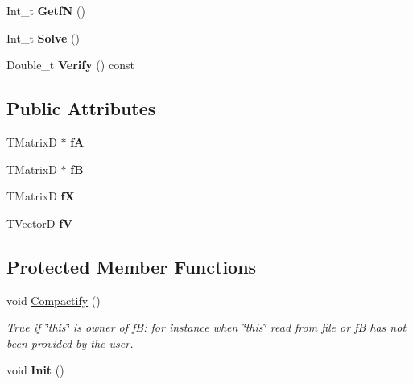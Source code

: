 \begin{DoxyCompactItemize}
\item 
\hypertarget{classTBandedLE_aee31a68599f547c764f4ecdafde6831f}{
Int\_\-t {\bfseries GetfN} ()}
\label{classTBandedLE_aee31a68599f547c764f4ecdafde6831f}

\item 
\hypertarget{classTBandedLE_acdc5e78e84c016c6b37c0f94e16184ca}{
Int\_\-t {\bfseries Solve} ()}
\label{classTBandedLE_acdc5e78e84c016c6b37c0f94e16184ca}

\item 
\hypertarget{classTBandedLE_adbcd39deac9f8711f7154e7552ca1151}{
Double\_\-t {\bfseries Verify} () const }
\label{classTBandedLE_adbcd39deac9f8711f7154e7552ca1151}

\end{DoxyCompactItemize}
\subsection*{Public Attributes}
\begin{DoxyCompactItemize}
\item 
\hypertarget{classTBandedLE_add083d782cac403e47ef44d1b047982f}{
TMatrixD $\ast$ {\bfseries fA}}
\label{classTBandedLE_add083d782cac403e47ef44d1b047982f}

\item 
\hypertarget{classTBandedLE_a6ff8099635a38a29aaab855688b61bb0}{
TMatrixD $\ast$ {\bfseries fB}}
\label{classTBandedLE_a6ff8099635a38a29aaab855688b61bb0}

\item 
\hypertarget{classTBandedLE_a7c68ccf2ccaea19424492c508febd82e}{
TMatrixD {\bfseries fX}}
\label{classTBandedLE_a7c68ccf2ccaea19424492c508febd82e}

\item 
\hypertarget{classTBandedLE_a044d8f4c2ac4dbd11798e6ace569058b}{
TVectorD {\bfseries fV}}
\label{classTBandedLE_a044d8f4c2ac4dbd11798e6ace569058b}

\end{DoxyCompactItemize}
\subsection*{Protected Member Functions}
\begin{DoxyCompactItemize}
\item 
\hypertarget{classTBandedLE_a8e09b2648396e1e8652ff8b0727965c1}{
void \hyperlink{classTBandedLE_a8e09b2648396e1e8652ff8b0727965c1}{Compactify} ()}
\label{classTBandedLE_a8e09b2648396e1e8652ff8b0727965c1}

\begin{DoxyCompactList}\small\item\em True if \char`\"{}this\char`\"{} is owner of fB: for instance when \char`\"{}this\char`\"{} read from file or fB has not been provided by the user. \item\end{DoxyCompactList}\item 
\hypertarget{classTBandedLE_a0171b48604c7767a1d2f798313874b87}{
void {\bfseries Init} ()}
\label{classTBandedLE_a0171b48604c7767a1d2f798313874b87}

\end{DoxyCompactItemize}
